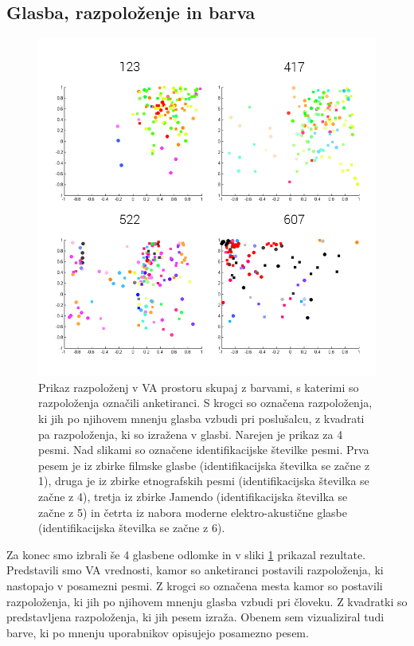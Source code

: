 \documentclass[a4paper, 12pt]{book}
\begin{document}
{\subsection{Glasba, razpoloženje in barva}

\begin{figure}[hbt]
\centering
\includegraphics[width=12.5cm]{images/moodmusic.png}

\caption{Prikaz razpoloženj v VA prostoru skupaj z barvami, s katerimi so razpoloženja označili anketiranci. S krogci so označena razpoloženja, ki jih po njihovem mnenju glasba vzbudi pri poslušalcu, z kvadrati pa razpoloženja, ki so izražena v glasbi. Narejen je prikaz za 4 pesmi. Nad slikami so označene identifikacijske številke pesmi. Prva pesem je iz zbirke filmske glasbe (identifikacijska številka se začne z 1), druga je iz zbirke etnografskih pesmi (identifikacijska številka se začne z 4), tretja iz zbirke Jamendo (identifikacijska številka se začne z 5) in četrta iz nabora moderne elektro-akustične glasbe (identifikacijska številka se začne z 6).}
\label{moodmusic}
\end{figure} 

Za konec smo izbrali še 4 glasbene odlomke in v sliki \ref{moodmusic} prikazal rezultate. Predstavili smo VA vrednosti, kamor so anketiranci postavili razpoloženja, ki nastopajo v posamezni pesmi. Z krogci so označena mesta kamor so postavili razpoloženja, ki jih po njihovem mnenju glasba vzbudi pri človeku. Z kvadratki so predstavljena razpoloženja, ki jih pesem izraža. Obenem sem vizualiziral tudi barve, ki po mnenju uporabnikov opisujejo posamezno pesem. 

}
\end{document}
